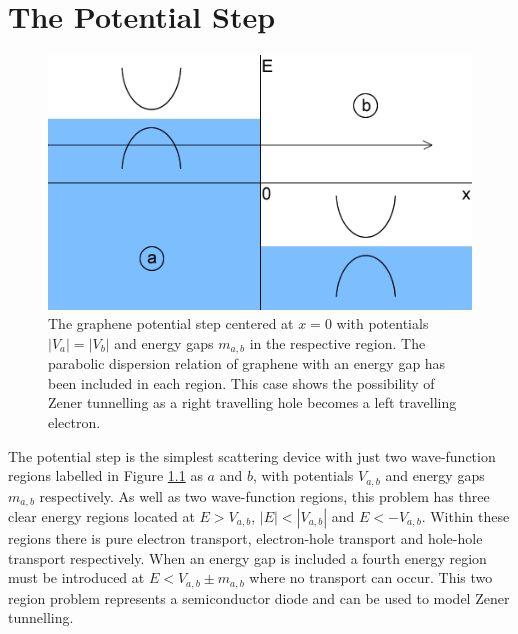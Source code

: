 

%
	\chapter{The Potential Step}
	\label{Potential Step}
		\begin{figure}
			\centerline{\includegraphics[scale=0.6]{images/rectangular-step-flat}}
			\caption{The graphene potential step centered at $x=0$ with potentials $|V_{a}|=|V_{b}|$ and energy gaps $m_{a,b}$ in the respective region. The parabolic dispersion relation of graphene with an energy gap has been included in each region. This case shows the possibility of Zener tunnelling as a right travelling hole becomes a left travelling electron.}
			\label{rectangular-step-flat}
		\end{figure}
		The potential step is the simplest scattering device with just two wave-function regions \cite{b13} labelled in Figure \ref{rectangular-step-flat} as $a$ and $b$, with potentials $V_{a,b}$ and energy gaps $m_{a,b}$ respectively. As well as two wave-function regions, this problem has three clear energy regions located at $E>V_{a,b}$, $|E|<|V_{a,b}|$ and $E<-V_{a,b}$. Within these regions there is pure electron transport, electron-hole transport and hole-hole transport respectively. When an energy gap is included a fourth energy region must be introduced at $E<V_{a,b}\pm m_{a,b}$ where no transport can occur. This two region problem represents a semiconductor diode and can be used to model Zener tunnelling.

